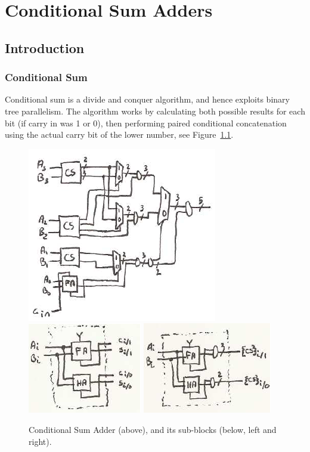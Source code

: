 \chapter{Conditional Sum Adders}

\section{Introduction}



\subsection{Conditional Sum}
Conditional sum is a divide and conquer algorithm, and hence exploits binary tree parallelism.  The algorithm works by calculating both possible results for each bit (if carry in was 1 or 0), then performing paired conditional concatenation using the actual carry bit of the lower number, see Figure~\ref{f-cond_sum_add}.

\begin{figure}
\caption{Conditional Sum Adder (above), and its sub-blocks (below, left and right).}\label{f-cond_sum_add}
\begin{center}
\includegraphics{conditional_sum.png}\\\vspace{.2in}
\includegraphics{cs_4out.png} \hspace{.2in} \includegraphics{cs_2out.png}
\end{center}
\end{figure}

